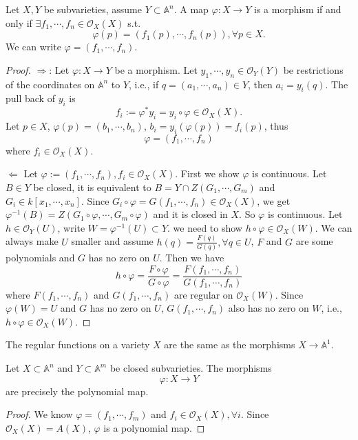 \begin{theorem}\label{9}
	Let $ X,Y $ be subvarieties, assume $ Y\subset \mathbb{A}^n $. A map $ \varphi:X\to Y $ is a morphism if and only if $ \exists f_1,\cdots,f_n\in \mathcal{O}_X(X) $ s.t.
	\begin{equation}
		\varphi(p)=(f_1(p),\cdots,f_n(p)),\forall p\in X.
	\end{equation}
	We can write $ \varphi = ( f_1,\cdots,f_n ) $.
\end{theorem}
\begin{proof}
	$ \Rightarrow $: Let $ \varphi :X\to Y $ be a morphism. Let $ y_1,\cdots, y_n \in \mathcal{O}_Y(Y)$ be restrictions of the coordinates on $ \mathbb{A}^n $ to $ Y $, i.e., if $ q=(a_1,\cdots,a_n)\in Y $, then $ a_i=y_i(q) $. The pull back of $ y_i $ is
	\begin{equation}
		f_i:=\varphi^\ast y_i=y_i\circ \varphi \in \mathcal{O}_X(X).
	\end{equation}
	Let $ p\in X $, $ \varphi(p)=(b_1,\cdots,b_n) $, $ b_i=y_i(\varphi(p))=f_i(p) $, thus
	$$
		\varphi= (f_1,\cdots,f_n)
	$$
	where $ f_i\in \mathcal{O}_X(X) $.

	$ \Leftarrow $ Let $ \varphi :=(f_1,\cdots,f_n),f_i\in \mathcal{O}_X(X) $. First we show $ \varphi  $  is continuous. Let $ B\in Y $ be closed, it is equivalent to $ B=Y\cap Z(G_1,\cdots,G_m) $ and $ G_i\in k[x_1,\cdots,x_n] $. Since
	$ G_i\circ \varphi = G(f_1,\cdots,f_n)\in \mathcal{O}_X(X) $, we get $ \varphi^{-1}(B)=Z(G_1\circ \varphi,\cdots,G_m\circ\varphi) $ and it is closed in $ X $. So $ \varphi $ is continuous. Let $ h\in \mathcal{O}_Y(U) $, write $ W=\varphi^{-1}(U)\subset Y $. we need to show $ h\circ \varphi \in \mathcal{O}_X(W) $. We can always make $ U $ smaller and assume $ h(q)=\frac{F(q)}{G(q)} ,\forall q\in U$, $ F $ and $ G $ are some polynomials and $ G $ has no zero on $ U $. Then we have
	\begin{equation}
		h\circ \varphi =\frac{F\circ \varphi}{G\circ \varphi}=\frac{F(f_1,\cdots,f_n)}{G(f_1,\cdots,f_n)}
	\end{equation}
	where $ F(f_1,\cdots,f_n) $ and $ G(f_1,\cdots,f_n) $ are regular on $ \mathcal{O}_X(W) $. Since $ \varphi(W)=U $ and $ G $ has no zero on $ U $, $ G(f_1,\cdots,f_n) $ also has no zero on $ W $, i.e., $ h\circ \varphi\in \mathcal{O}_X(W) $.
\end{proof}
\begin{remark}
	The regular functions on a variety $ X $ are the same as the morphisms $ X\to \mathbb{A}^1 $.
\end{remark}
\begin{corollary}
	Let $ X\subset \mathbb{A}^n $ and $ Y\subset \mathbb{A}^m $ be closed subvarieties. The morphisms
	$$
		\varphi:X\to Y
	$$
	are precisely the polynomial map.
\end{corollary}
\begin{proof}
	We know $ \varphi=(f_1,\cdots,f_m) $ and $ f_i\in \mathcal{O}_X(X), \forall i$. Since $ \mathcal{O}_X(X)=A(X) $, $ \varphi $ is a polynomial map.
\end{proof}

